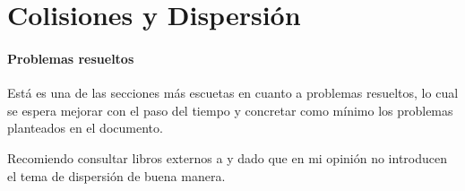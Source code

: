 \documentclass[/home/hernan-barquero/Documents/Apuntes_mecanica_teorica/main.tex]{subfiles}
\begin{document}
    \part{Colisiones y Dispersión}



    \subsection{Problemas resueltos}
    Está es una de las secciones más escuetas en cuanto a problemas resueltos, lo cual se espera mejorar con el paso del tiempo y concretar como mínimo los problemas planteados en el documento.

    Recomiendo consultar libros externos a \cite{Taylor} y \cite{Thornton} dado que en mi opinión no introducen el tema de dispersión de buena manera.

    
\end{document}
